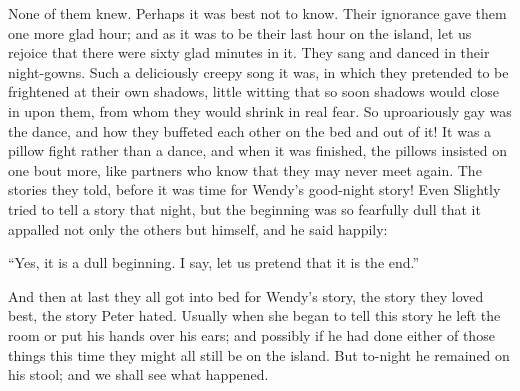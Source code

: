 None of them knew.
Perhaps it was best not to know.
Their ignorance gave them one more glad hour;
and as it was to be their last hour on the island,
let us rejoice that there were sixty glad minutes in it.
They sang and danced in their night-gowns.
Such a deliciously creepy song it was,
in which they pretended to be frightened at their own shadows,
little witting that so soon shadows would close in upon them,
from whom they would shrink in real fear.
So uproariously gay was the dance,
and how they buffeted each other on the bed and out of it!
It was a pillow fight rather than a dance,
and when it was finished, the pillows insisted on one bout more,
like partners who know that they may never meet again.
The stories they told, before it was time for Wendy’s good-night story!
Even Slightly tried to tell a story that night,
but the beginning was so fearfully dull that it appalled not only the others but himself,
and he said happily:

“Yes, it is a dull beginning.
I say, let us pretend that it is the end.”

And then at last they all got into bed for Wendy’s story,
the story they loved best, the story Peter hated.
Usually when she began to tell this story he left the room or put his hands over his ears;
and possibly if he had done either of those things this time they might all still be on the island.
But to-night he remained on his stool;
and we shall see what happened.

\endinput
